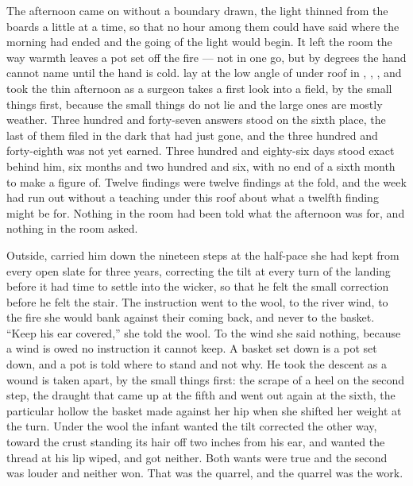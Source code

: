 The afternoon came on without a boundary drawn, the light thinned from the boards a little at a time, so that no hour among them could have said where the morning had ended and the going of the light would begin. It left the room the way warmth leaves a pot set off the fire --- not in one go, but by degrees the hand cannot name until the hand is cold.  lay at the low angle of  under  roof in , , , and took the thin afternoon as a surgeon takes a first look into a field, by the small things first, because the small things do not lie and the large ones are mostly weather. Three hundred and forty-seven answers stood on the sixth place, the last of them filed in the dark that had just gone, and the three hundred and forty-eighth was not yet earned. Three hundred and eighty-six days stood exact behind him, six months and two hundred and six, with no end of a sixth month to make a figure of. Twelve findings were twelve findings at the fold, and the week had run out without a teaching under this roof about what a twelfth finding might be for. Nothing in the room had been told what the afternoon was for, and nothing in the room asked.

Outside,  carried him down the nineteen steps at the half-pace she had kept from every open slate for three years, correcting the tilt at every turn of the landing before it had time to settle into the wicker, so that he felt the small correction before he felt the stair. The instruction went to the wool, to the river wind, to the fire she would bank against their coming back, and never to the basket. “Keep his ear covered,” she told the wool. To the wind she said nothing, because a wind is owed no instruction it cannot keep. A basket set down is a pot set down, and a pot is told where to stand and not why. He took the descent as a wound is taken apart, by the small things first: the scrape of a heel on the second step, the draught that came up at the fifth and went out again at the sixth, the particular hollow the basket made against her hip when she shifted her weight at the turn. Under the wool the infant wanted the tilt corrected the other way, toward the crust standing its hair off two inches from his ear, and wanted the thread at his lip wiped, and got neither. Both wants were true and the second was louder and neither won. That was the quarrel, and the quarrel was the work.

